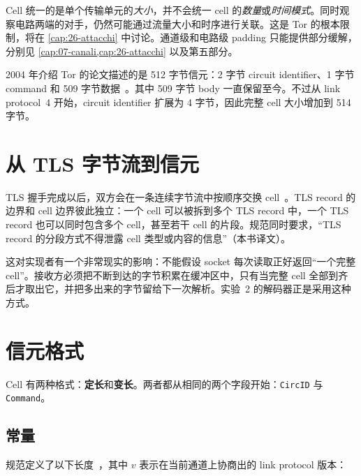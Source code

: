 \begin{attenzione}
Cell 统一的是单个传输单元的\emph{大小}，并不会统一 cell 的\emph{数量}或\emph{时间模式}。同时观察电路两端的对手，仍然可能通过流量大小和时序进行关联。这是 Tor 的根本限制，将在 \cref{cap:26-attacchi} 中讨论。通道级和电路级 padding 只能提供部分缓解，分别见 \cref{cap:07-canali,cap:26-attacchi} 以及第五部分。
\end{attenzione}

\begin{storia}[512 字节]
2004 年介绍 Tor 的论文描述的是 512 字节信元：2 字节 circuit identifier、1 字节 command 和 509 字节数据~\cite{dingledine2004tor}。其中 509 字节 body 一直保留至今。不过从 link protocol~4 开始，circuit identifier 扩展为 4 字节，因此完整 cell 大小增加到 514 字节。
\end{storia}

\section{从 TLS 字节流到信元}\label{sec:celle-tls}

TLS 握手完成以后，双方会在一条连续字节流中按顺序交换 cell~。TLS record 的边界和 cell 边界彼此独立：一个 cell 可以被拆到多个 TLS record 中，一个 TLS record 也可以同时包含多个 cell，甚至若干 cell 的片段。规范同时要求，\enquote{TLS record 的分段方式不得泄露 cell 类型或内容的信息}（本书译文）。

这对实现者有一个非常现实的影响：不能假设 socket 每次读取正好返回\enquote{一个完整 cell}。接收方必须把不断到达的字节积累在缓冲区中，只有当完整 cell 全部到齐后才取出它，并把多出来的字节留给下一次解析。实验~2 的解码器正是采用这种方式。

\section{信元格式}\label{sec:celle-formato}

Cell 有两种格式：\textbf{定长}和\textbf{变长}。两者都从相同的两个字段开始：\texttt{CircID} 与 \texttt{Command}。

\subsection{常量}

规范定义了以下长度~，其中 $v$ 表示在当前通道上协商出的 link protocol 版本：

